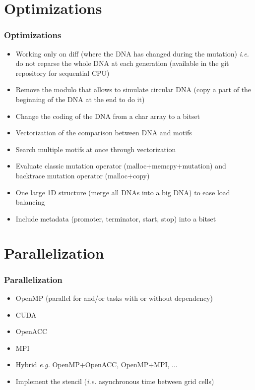 \documentclass{beamer}
\begin{document}
\section{Optimizations}
\begin{frame}
 \frametitle{Optimizations}
 \begin{itemize}
  \item Working only on diff (where the DNA has changed during the mutation) \textit{i.e.} do not reparse the whole DNA at each generation (available in the git repository for sequential CPU)
  \item Remove the modulo that allows to simulate circular DNA (copy a part of the beginning of the DNA at the end to do it)
  \item Change the coding of the DNA from a char array to a bitset
  \item Vectorization of the comparison between DNA and motifs
  \item Search multiple motifs at once through vectorization
  \item Evaluate classic mutation operator (malloc+memcpy+mutation) and backtrace mutation operator (malloc+copy)
  \item One large 1D structure (merge all DNAs into a big DNA) to ease load balancing
  \item Include metadata (promoter, terminator, start, stop) into a bitset
 \end{itemize}
\end{frame}

\section{Parallelization}
\begin{frame}
 \frametitle{Parallelization}
 \begin{itemize}
  \item OpenMP (parallel for and/or tasks with or without dependency)
  \item CUDA
  \item OpenACC
  \item MPI
  \item Hybrid \textit{e.g.} OpenMP+OpenACC, OpenMP+MPI, ...
  \vfill
  \item Implement the stencil (\textit{i.e.} asynchronous time between grid cells)
 \end{itemize}
\end{frame}
\end{document}

